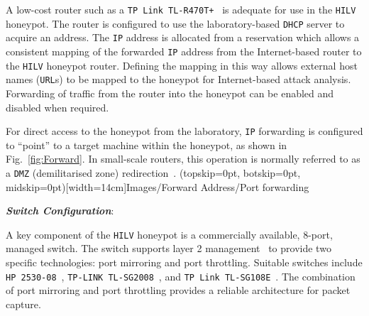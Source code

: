 \documentclass{ieeeaccess}
\begin{document}
A low-cost router such as a \texttt{TP Link TL-R470T+}~\cite{TPLINKR470:18} is adequate for use in the \texttt{HILV} honeypot. The router is configured to use the laboratory-based \texttt{DHCP} server to acquire an  address. The \texttt{IP} address is
allocated from a reservation which allows a consistent mapping of the forwarded
\texttt{IP} address from the Internet-based router to the \texttt{HILV} honeypot
router. Defining the mapping in this way allows external host names
(\texttt{URL}s) to be mapped to the honeypot for Internet-based attack
analysis. Forwarding of traffic from the router into the honeypot
can be enabled and disabled when required.

For direct access to the honeypot from the laboratory, \texttt{IP} forwarding is
configured to  ``point'' to a target machine within the honeypot,
as shown in Fig.~\ref{fig:Forward}. In small-scale routers, this operation is
normally referred to as a \texttt{DMZ} (demilitarised zone) redirection~\cite{MB:01}.
\newline
\Figure[t!](topskip=0pt, botskip=0pt, midskip=0pt)[width=14cm]{Images/Forward}
{Address/Port forwarding\label{fig:Forward}}


\noindent\textit{\textbf{Switch Configuration}}:

A key component of the \texttt{HILV} honeypot is a commercially available,
8-port, managed switch. The switch supports layer 2 management~\cite{ST:98} to
provide two specific technologies: port mirroring and port throttling. Suitable
switches include \texttt{HP 2530-08}~\cite{HP:17}, \texttt{TP-LINK
TL-SG2008}~\cite{TP:17}, and \texttt{TP Link TL-SG108E}~\cite{TPSG108E:18}.  The
combination of port mirroring and port throttling provides a reliable
architecture for packet capture.  \newline\newline
\end{document}
